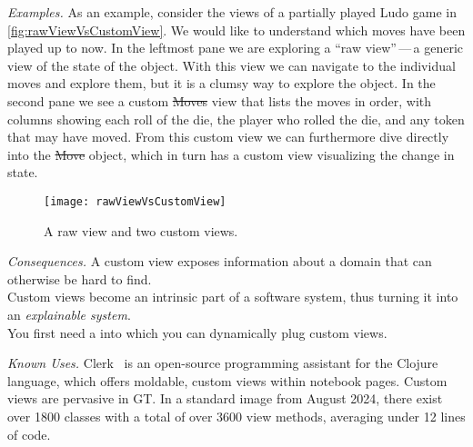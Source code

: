 \documentclass[acmsmall,screen,authorversion,nonacm]{acmart} %
\newcommand\eog[1]{\nbc{Edward}{#1}{purple}}
\newcommand\cp[1]{\nbe{Cesare}{#1}{olive}} %
\newcommand\ws[1]{\nbe{Workshop}{#1}{teal}} %
\newcommand{\patref}[1]{\emph{\nameref{pat:#1}}\xspace}
\newcommand{\patsec}[1]{\noindent\textit{#1.}\xspace}
\begin{document}
\patsec{Examples}
As an example, consider the views of a partially played Ludo game in \autoref{fig:rawViewVsCustomView}.
We would like to understand which moves have been played up to now.
In the leftmost pane we are exploring a ``raw view''\,---\,a generic view of the state of the object.
With this view we can navigate to the individual moves and explore them, but it is a clumsy way to explore the object.
In the second pane we see a custom \st{Moves} view that lists the moves in order, with columns showing each roll of the die, the player who rolled the die, and any token that may have moved.
From this custom view we can furthermore dive directly into the \st{Move} object, which in turn has a custom view visualizing the change in state.

\begin{figure}[h]
  \texttt{[image: rawViewVsCustomView]}
  \caption{A raw view and two custom views.}
  \label{fig:rawViewVsCustomView}
\end{figure}

\patsec{Consequences}
A custom view exposes information about a domain that can otherwise be hard to find.\\
Custom views become an intrinsic part of a software system,
thus turning it into an \emph{explainable system}.\\
You first need a \patref{MoldableTool} into which you can dynamically plug custom views.



\patsec{Known Uses}
Clerk~\cite{Kava23a} is an open-source programming assistant for the Clojure language, which offers moldable, custom views within notebook pages.
Custom views are pervasive in GT.
In a standard image from August 2024, there exist over 1800 classes with a total of over 3600 view methods, averaging under 12 lines of code.
\end{document}
